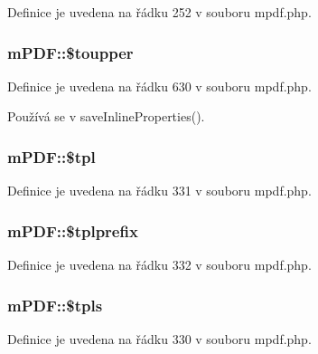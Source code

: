 Definice je uvedena na řádku 252 v souboru mpdf.\-php.

\hypertarget{classm_p_d_f_aafb2a620cfa9060bf73aa9c0754187b7}{
\subsubsection[{\$toupper}]{\setlength{\rightskip}{0pt plus 5cm}m\-P\-D\-F\-::\$toupper}}\label{classm_p_d_f_aafb2a620cfa9060bf73aa9c0754187b7}


Definice je uvedena na řádku 630 v souboru mpdf.\-php.



Používá se v save\-Inline\-Properties().

\hypertarget{classm_p_d_f_ad6a15644f2611ac002318c134da79c2a}{
\subsubsection[{\$tpl}]{\setlength{\rightskip}{0pt plus 5cm}m\-P\-D\-F\-::\$tpl}}\label{classm_p_d_f_ad6a15644f2611ac002318c134da79c2a}


Definice je uvedena na řádku 331 v souboru mpdf.\-php.

\hypertarget{classm_p_d_f_a2f30fa20bd7cc74a25f4d65e374e6293}{
\subsubsection[{\$tplprefix}]{\setlength{\rightskip}{0pt plus 5cm}m\-P\-D\-F\-::\$tplprefix}}\label{classm_p_d_f_a2f30fa20bd7cc74a25f4d65e374e6293}


Definice je uvedena na řádku 332 v souboru mpdf.\-php.

\hypertarget{classm_p_d_f_a938a86742fcae3962842336246ae13ee}{
\subsubsection[{\$tpls}]{\setlength{\rightskip}{0pt plus 5cm}m\-P\-D\-F\-::\$tpls}}\label{classm_p_d_f_a938a86742fcae3962842336246ae13ee}


Definice je uvedena na řádku 330 v souboru mpdf.\-php.

